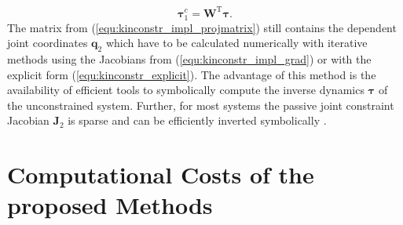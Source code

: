 \documentclass{svproc}
\newcommand{\bm}[1]{\boldsymbol{#1}}
\newcommand{\transp}[0]{{\mathrm{T}}}
\begin{document}
%
\begin{equation}
\bm{\tau}^{c}_{1} = \bm{W}^\transp \bm{\tau}.
\label{equ:tau_projection}
\end{equation}
%
The matrix from (\ref{equ:kinconstr_impl_projmatrix}) still contains the dependent joint coordinates $\bm{q}_2$ which have to be calculated numerically with iterative methods using the Jacobians from (\ref{equ:kinconstr_impl_grad}) or with the explicit form (\ref{equ:kinconstr_explicit}).
The advantage of this method is the availability of efficient tools to symbolically compute the inverse dynamics $\bm{\tau}$ of the unconstrained system.
Further, for most systems the passive joint constraint Jacobian $\bm{J}_2$ is sparse and can be efficiently inverted symbolically \cite{ParkChoPlo1999}.

\section{Computational Costs of the proposed Methods}
\label{sec:simulation}
\end{document}
